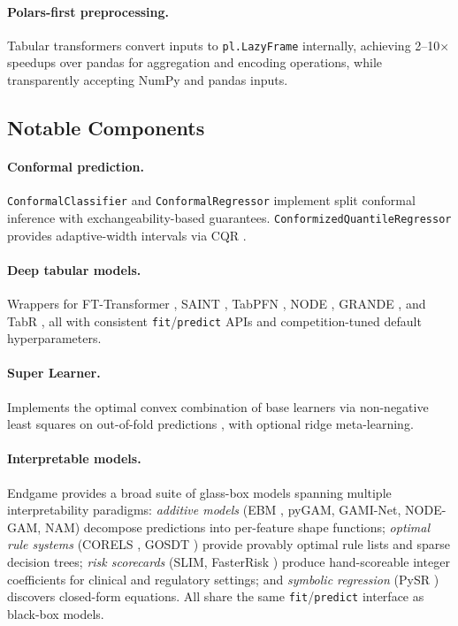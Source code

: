 \documentclass[11pt]{article}
\begin{document}
\paragraph{Polars-first preprocessing.} Tabular transformers convert inputs
to \texttt{pl.LazyFrame} internally, achieving 2--10$\times$ speedups over
pandas for aggregation and encoding operations, while transparently accepting
NumPy and pandas inputs.

\subsection{Notable Components}

\paragraph{Conformal prediction.} \texttt{ConformalClassifier} and
\texttt{ConformalRegressor} implement split conformal inference with
exchangeability-based guarantees. \texttt{ConformizedQuantileRegressor}
provides adaptive-width intervals via CQR \citep{romano2019conformalized}.

\paragraph{Deep tabular models.} Wrappers for FT-Transformer
\citep{gorishniy2021revisiting}, SAINT \citep{somepalli2021saint},
TabPFN \citep{hollmann2022tabpfn}, NODE \citep{popov2020neural},
GRANDE \citep{marton2024grande}, and TabR \citep{gorishniy2024tabr},
all with consistent \texttt{fit}/\texttt{predict} APIs and competition-tuned
default hyperparameters.

\paragraph{Super Learner.} Implements the optimal convex combination of
base learners via non-negative least squares on out-of-fold predictions
\citep{van2007super}, with optional ridge meta-learning.

\paragraph{Interpretable models.} Endgame provides a broad suite of
glass-box models spanning multiple interpretability paradigms:
\emph{additive models} (EBM \citep{nori2019interpretml}, pyGAM, GAMI-Net,
NODE-GAM, NAM) decompose predictions into per-feature shape functions;
\emph{optimal rule systems} (CORELS \citep{angelino2017learning}, GOSDT
\citep{lin2020generalized}) provide provably optimal rule lists and sparse
decision trees; \emph{risk scorecards} (SLIM, FasterRisk
\citep{liu2022fasterrisk}) produce hand-scoreable integer coefficients for
clinical and regulatory settings; and \emph{symbolic regression} (PySR
\citep{cranmer2023interpretable}) discovers closed-form equations. All share
the same \texttt{fit}/\texttt{predict} interface as black-box models.
\end{document}
